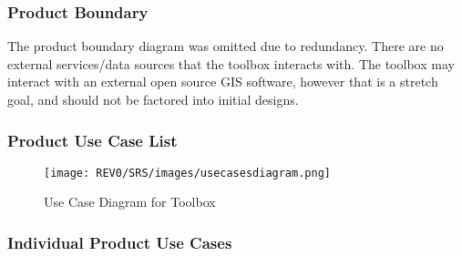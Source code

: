 \documentclass[12pt, titlepage]{article}
\begin{document}
\subsubsection{Product Boundary}
The product boundary diagram was omitted due to redundancy. There are no external services/data sources that the toolbox interacts with. The toolbox may interact with an external open source GIS software, however that is a stretch goal, and should not be factored into initial designs. 

\subsubsection{Product Use Case List}
\begin{figure}[H]
	    \begin{center}
    	    \texttt{[image: REV0/SRS/images/usecasesdiagram.png]}
    	    \caption{Use Case Diagram for Toolbox}
    	    \label{fig:Toolbox Use Case Diagram}
    	\end{center}
\end{figure}

\newpage

\subsubsection{Individual Product Use Cases}
\end{document}
